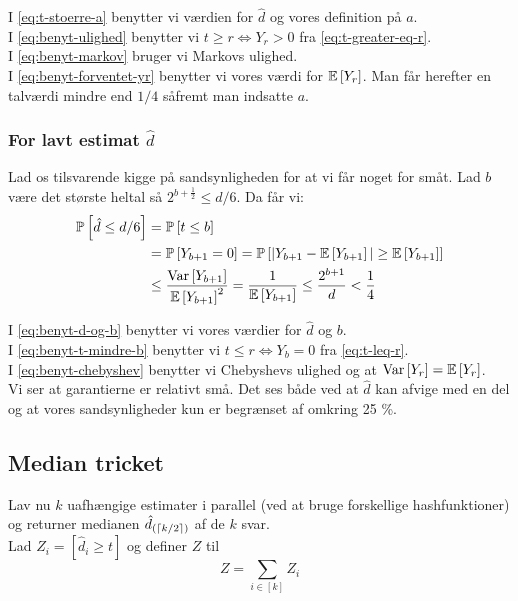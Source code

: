 I \cref{eq:t-stoerre-a} benytter vi værdien for $\hat d$ og vores definition på $a$.\\
I \cref{eq:benyt-ulighed} benytter vi $t \geq r \Longleftrightarrow Y_r > 0$ fra \cref{eq:t-greater-eq-r}.\\
I \cref{eq:benyt-markov} bruger vi Markovs ulighed.\\
I \cref{eq:benyt-forventet-yr} benytter vi vores værdi for $\mathbb{E} \left[  Y_r  \right]$. Man får herefter en talværdi mindre end $1/4$ såfremt man indsatte $a$.



\subsubsection{For lavt estimat $\hat d$}
Lad os tilsvarende kigge på sandsynligheden for at vi får noget for småt. Lad $b$ være det største heltal så $2^{b + \frac{1}{2}} \leq d/6$. Da får vi:
\begin{align}
  \mathbb{P} \left[  \hat d \leq d/6  \right]
  &= \mathbb{P} \left[  t \leq b  \right] \label{eq:benyt-d-og-b} \\
  &= \mathbb{P} \left[  Y_{b+1} = 0  \right]
  = \mathbb{P} \left[   |Y_{b+1} - \mathbb{E} \left[  Y_{b+1}  \right]| \geq \mathbb{E} \left[  Y_{b+1}  \right]   \right] \label{eq:benyt-t-mindre-b} \\
  &\leq \frac{\text{Var} \left[  Y_{b+1}  \right]}{ \mathbb{E} \left[  Y_{b+1}  \right]^2 }
  = \frac{1}{\mathbb{E} \left[  Y_{b+1}  \right]}
  \leq \frac{2^{b+1}}{d} \label{eq:benyt-chebyshev}
  < \frac{1}{4}
\end{align}

I \cref{eq:benyt-d-og-b} benytter vi vores værdier for $\hat d$ og $b$.\\
I \cref{eq:benyt-t-mindre-b} benytter vi $t \leq r \Longleftrightarrow Y_b = 0$ fra \cref{eq:t-leq-r}.\\
I \cref{eq:benyt-chebyshev} benytter vi Chebyshevs ulighed og at $\text{Var} \left[  Y_r  \right] = \mathbb{E} \left[  Y_r  \right]$.\\

Vi ser at garantierne er relativt små. Det ses både ved at $\hat d$ kan afvige med en del og at vores sandsynligheder kun er begrænset af omkring 25 \%.

\subsection{Median tricket}
Lav nu $k$ uafhængige estimater i parallel (ved at bruge forskellige hashfunktioner) og returner medianen $\hat d_{(\left\lceil k/2 \right\rceil)}$ af de $k$ svar.\\


Lad $Z_i = [\hat d_i \geq t]$ og definer $Z$ til
$$
Z = \sum_{i \in [k]} Z_i
$$

